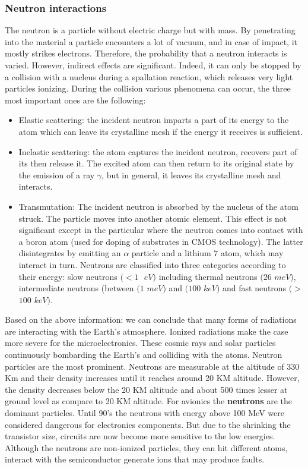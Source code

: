 \subsubsection{Neutron interactions}
The neutron is a particle without electric charge but with mass. By penetrating into
the material a particle encounters a lot of vacuum, and in case of impact, it mostly strikes electrons\cite{normand1998extensions}. Therefore, the probability that a neutron interacts is varied. However, indirect effects are significant. Indeed, it can only be stopped by a
collision with a nucleus during a spallation reaction, which releases very light particles
ionizing. During the collision various phenomena can occur, the three most important ones are the following:
\begin{itemize}

\item{Elastic scattering: the incident neutron imparts a part of its energy to the atom
which can leave its crystalline mesh if the energy it receives is sufficient.}
\item{Inelastic scattering: the atom captures the incident neutron, recovers part of its
then release it. The excited atom can then return to its original state by
the emission of a ray $\gamma$, but in general, it leaves its crystalline mesh and interacts.}
\item{Transmutation: The incident neutron is absorbed by the nucleus of the atom struck. The particle moves into another atomic element. This effect is not significant except in the
particular where the neutron comes into contact with a boron atom (used for doping
of substrates in CMOS technology). The latter disintegrates by emitting an $\alpha$ particle and
a lithium $7$ atom, which may interact in turn.}
Neutrons are classified into three categories according to their energy: slow neutrons
$(<1$ $ $ $eV$$)$ including thermal neutrons $(26$ $ $$meV$$)$, intermediate neutrons (between $(1$ $  $$meV$$)$ and
 $(100$ $ $$keV$$)$ and fast neutrons $(>$$100$ $ $$keV$$)$.




\end{itemize}



Based on the above information: we can conclude that many forms of radiations are interacting with the Earth's atmosphere. Ionized radiations make the case more severe for the microelectronics. These cosmic rays and solar particles continuously bombarding the Earth's and colliding with the atoms. Neutron particles are the most prominent. Neutrons are measurable at the altitude of 330 Km and their density increases until it reaches around 20 KM altitude. However, the density decreases below the 20 KM altitude and about 500 times lesser at ground level as compare to 20 KM altitude. For avionics the \textbf{neutrons} are the dominant particles.  Until 90's the neutrons with energy above 100 MeV were considered dangerous for electronics components. But due to the shrinking the transistor size, circuits are now become more sensitive to the low energies. Although the neutrons are non-ionized particles, they can hit different atoms, interact with the semiconductor generate ions that may produce faults.   

